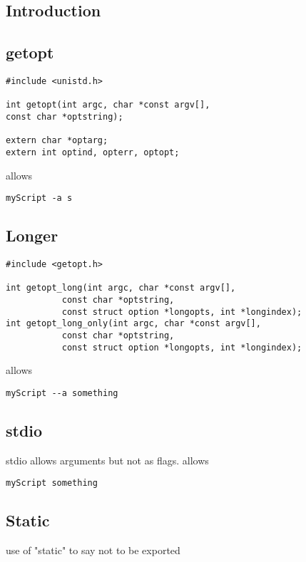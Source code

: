 
\subsection{Introduction}

\subsection{getopt}

\begin{verbatim}
#include <unistd.h>

int getopt(int argc, char *const argv[],
const char *optstring);

extern char *optarg;
extern int optind, opterr, optopt;

\end{verbatim}


allows
\begin{verbatim}
myScript -a s
\end{verbatim}

\subsection{Longer}

\begin{verbatim}
#include <getopt.h>

int getopt_long(int argc, char *const argv[],
           const char *optstring,
           const struct option *longopts, int *longindex);
int getopt_long_only(int argc, char *const argv[],
           const char *optstring,
           const struct option *longopts, int *longindex);
\end{verbatim}


allows
\begin{verbatim}
myScript --a something
\end{verbatim}

\subsection{stdio}

stdio allows arguments but not as flags. 
allows
\begin{verbatim}
myScript something
\end{verbatim}


\subsection{Static}

use of "static" to say not to be exported

